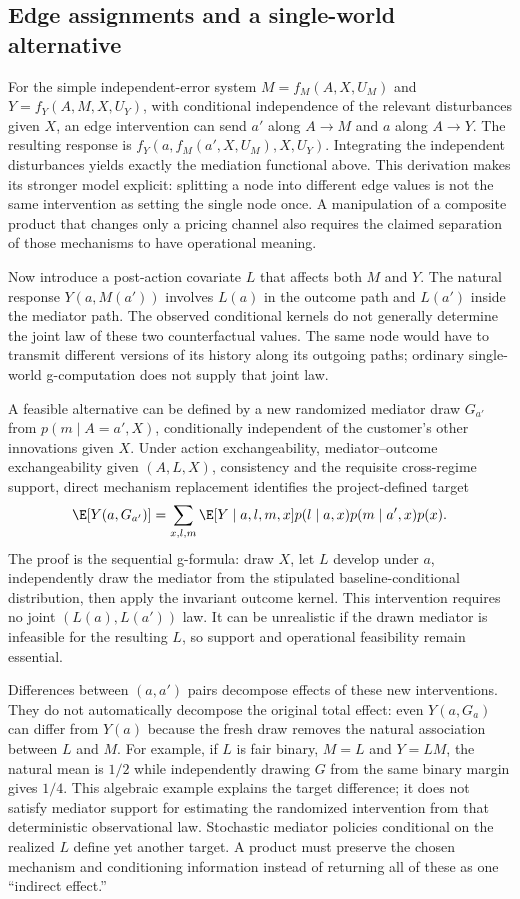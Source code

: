 \subsection{Edge assignments and a single-world alternative}
\label{r3:mediation-interventions}
For the simple independent-error system
$M=f_M(A,X,U_M)$ and $Y=f_Y(A,M,X,U_Y)$, with conditional
independence of the relevant disturbances given $X$, an edge
intervention can send $a'$ along $A\to M$ and $a$ along $A\to Y$.
The resulting response is
$f_Y(a,f_M(a',X,U_M),X,U_Y)$. Integrating the independent
disturbances yields exactly the mediation functional above. This
derivation makes its stronger model explicit: splitting a node into
different edge values is not the same intervention as setting the
single node once. A manipulation of a composite product that changes
only a pricing channel also requires the claimed separation of those
mechanisms to have operational meaning.

Now introduce a post-action covariate $L$ that affects both $M$ and
$Y$. The natural response $Y(a,M(a'))$ involves $L(a)$ in the outcome
path and $L(a')$ inside the mediator path. The observed conditional
kernels do not generally determine the joint law of these two
counterfactual values. The same node would have to transmit different
versions of its history along its outgoing paths; ordinary
single-world g-computation does not supply that joint law.

A feasible alternative can be defined by a new randomized mediator
draw $G_{a'}$ from $p(m\mid A=a',X)$, conditionally independent of
the customer's other innovations given $X$. Under action
exchangeability, mediator--outcome exchangeability given $(A,L,X)$,
consistency and the requisite cross-regime support, direct mechanism
replacement identifies the project-defined target
\begin{equation}
 \E[Y(a,G_{a'})]=\sum_{x,l,m}
 \E[Y\mid a,l,m,x]p(l\mid a,x)p(m\mid a',x)p(x).
 \label{r3:random-mediator}
\end{equation}
The proof is the sequential g-formula: draw $X$, let $L$ develop
under $a$, independently draw the mediator from the stipulated
baseline-conditional distribution, then apply the invariant outcome
kernel. This intervention requires no joint $(L(a),L(a'))$ law.
It can be unrealistic if the drawn mediator is infeasible for the
resulting $L$, so support and operational feasibility remain essential.

Differences between $(a,a')$ pairs decompose effects of these new
interventions. They do not automatically decompose the original
total effect: even $Y(a,G_a)$ can differ from $Y(a)$ because the
fresh draw removes the natural association between $L$ and $M$.
For example, if $L$ is fair binary, $M=L$ and $Y=LM$, the natural
mean is $1/2$ while independently drawing $G$ from the same binary
margin gives $1/4$. This algebraic example explains the target
difference; it does not satisfy mediator support for estimating the
randomized intervention from that deterministic observational law.
Stochastic mediator policies conditional on the realized $L$ define
yet another target. A product must preserve the chosen mechanism
and conditioning information instead of returning all of these as
one ``indirect effect.''

